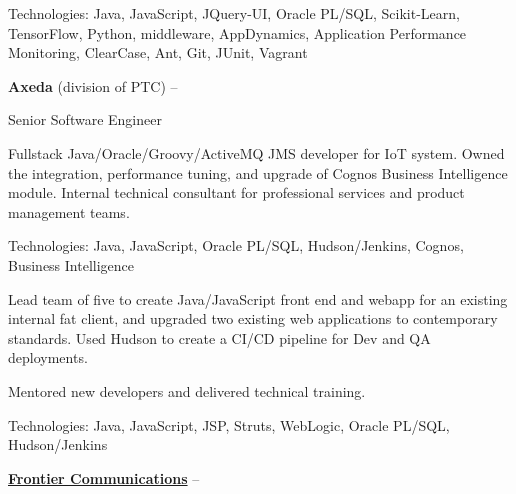 \documentclass[letterpaper,MMMMyyyy,nonstopmode]{simpleresumecv}
\newif\ifLOCATION
\newif\ifLONG
\begin{document}
\begin{Body}
\begin{Detail}
\Gap
Technologies: Java, JavaScript, JQuery-UI, Oracle PL/SQL, Scikit-Learn, TensorFlow, Python, middleware, AppDynamics, Application Performance Monitoring, ClearCase, Ant, Git, JUnit, Vagrant
\end{Detail}
\fi

\BigGap

\Entry
\textbf{Axeda} (division of PTC)
\hfill 
 --  

Senior Software Engineer
\ifLOCATION
\hfill
Rochester, New York
\fi

\begin{Detail}
\BulletItem
Fullstack Java/Oracle/Groovy/ActiveMQ JMS developer for IoT system. 
\BulletItem
Owned the integration, performance tuning, and upgrade of Cognos Business Intelligence module.
\BulletItem
Internal technical consultant for professional services and product management teams.

\Gap
Technologies: Java, JavaScript, Oracle PL/SQL, Hudson/Jenkins, Cognos, Business Intelligence
\end{Detail}

\ifLONG

\BigGap
\Entry
\href{http://www.paychex.com/}
{\textbf{Paychex}}
\hfill 
\DatestampY{2005} -- \DatestampY{2010}

Lead Developer
\ifLOCATION
\hfill
Rochester, New York
\fi

\begin{Detail}
\BulletItem
Lead team of five to create Java/JavaScript front end and webapp for an existing internal fat client, and upgraded two existing web applications to contemporary standards. Used Hudson to create a CI/CD pipeline for Dev and QA deployments.

\BulletItem
Mentored new developers and delivered technical training.
\iffalse
\BulletItem
Member of architecture team to research and set five-year strategy for web application strategy.
\fi

\Gap
Technologies: Java, JavaScript, JSP, Struts, WebLogic, Oracle PL/SQL, Hudson/Jenkins 
\end{Detail}

\BigGap
\Entry
\href{http://www.frontier.com/}
{\textbf{Frontier Communications}}
\hfill 
 -- 


\end{Body}
\end{document}

